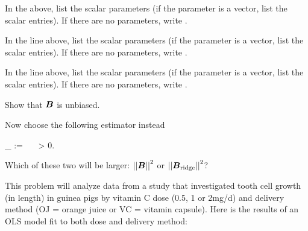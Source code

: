 \documentclass[12pt]{article}
\begin{document}
\begin{enumerate}[(a)]

 In the  above, list the scalar parameters (if the parameter is a vector, list the scalar entries). If there are no parameters, write .\\


 In the  line above, list the scalar parameters (if the parameter is a vector, list the scalar entries). If there are no parameters, write .\\

\inred{$\sigsq$}

 In the  line above, list the scalar parameters (if the parameter is a vector, list the scalar entries). If there are no parameters, write . \\


 Show that $\boldsymbol{B}$ is unbiased.


\pagebreak 

\noindent Now choose the following estimator instead

\beqn
\B_{} :=  \Xt \Y ~~~\lambda > 0.
\eeqn


 Which of these two will be larger: $\normsq{\B}$ or $\left|\left|\boldsymbol{B}_{\text{ridge}}\right|\right|^2$? \\

\inred{$\normsq{\B}$}


\end{enumerate}


\problem This problem will analyze data from a study that investigated tooth cell growth (in length) in guinea pigs by vitamin C dose (0.5, 1 or 2mg/d) and delivery method (OJ = orange juice or VC = vitamin capsule). Here is the results of an OLS model fit to both dose and delivery method:
\end{document}
